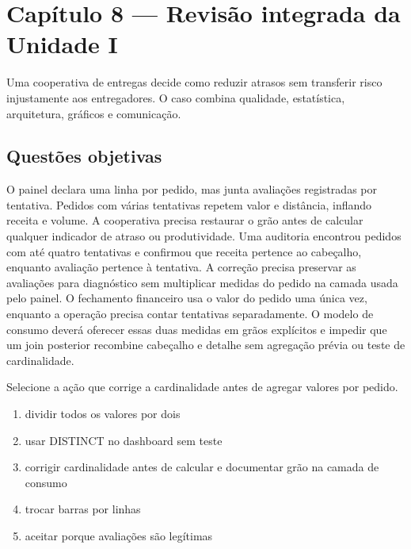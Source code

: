 \section{Capítulo 8 --- Revisão integrada da Unidade I}

Uma cooperativa de entregas decide como reduzir atrasos sem transferir risco injustamente aos entregadores. O caso combina qualidade, estatística, arquitetura, gráficos e comunicação.

\subsection{Questões objetivas}


\TextoBase

O painel declara uma linha por pedido, mas junta avaliações registradas por tentativa. Pedidos com várias tentativas repetem valor e distância, inflando receita e volume. A cooperativa precisa restaurar o grão antes de calcular qualquer indicador de atraso ou produtividade. Uma auditoria encontrou pedidos com até quatro tentativas e confirmou que receita pertence ao cabeçalho, enquanto avaliação pertence à tentativa. A correção precisa preservar as avaliações para diagnóstico sem multiplicar medidas do pedido na camada usada pelo painel. O fechamento financeiro usa o valor do pedido uma única vez, enquanto a operação precisa contar tentativas separadamente. O modelo de consumo deverá oferecer essas duas medidas em grãos explícitos e impedir que um join posterior recombine cabeçalho e detalhe sem agregação prévia ou teste de cardinalidade.

\FonteDidatica

\Comando Selecione a ação que corrige a cardinalidade antes de agregar valores por pedido.

\begin{enumerate}[label=\Alph*)]

\item dividir todos os valores por dois

\item usar DISTINCT no dashboard sem teste

\item corrigir cardinalidade antes de calcular e documentar grão na camada de consumo

\item trocar barras por linhas

\item aceitar porque avaliações são legítimas

\end{enumerate}

